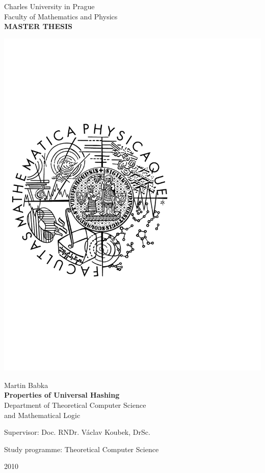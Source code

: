 \begin{titlepage}
\begin{center}

\large
Charles University in Prague\\
Faculty of Mathematics and Physics\\

\vspace{5mm}
{\Large\bf MASTER THESIS}

\vspace{55mm}
\includegraphics[scale=0.45,viewport=0 0 371 365]{images/logo}

\vspace{11mm}
{\Large Martin Babka}\\
\vspace{5mm}
{\Large\bf Properties of Universal Hashing}\\
\vspace{5mm}
Department of Theoretical Computer Science\\ and Mathematical Logic\\
\end{center}
\vspace{15mm}

\large\centering\noindent Supervisor: Doc. RNDr. Václav Koubek, DrSc.\\
\vspace{5mm} 

\centering\noindent Study programme: Theoretical Computer Science
\vspace{\fill}

\begin{center}
2010
\end{center}

\end{titlepage}